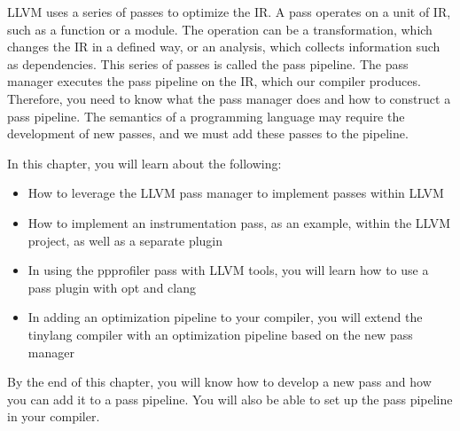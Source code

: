 
LLVM uses a series of passes to optimize the IR. A pass operates on a unit of IR, such as a function or a module. The operation can be a transformation, which changes the IR in a defined way, or an analysis, which collects information such as dependencies. This series of passes is called the pass pipeline. The pass manager executes the pass pipeline on the IR, which our compiler produces. Therefore, you need to know what the pass manager does and how to construct a pass pipeline. The semantics of a programming language may require the development of new passes, and we must add these passes to the pipeline.

In this chapter, you will learn about the following:

\begin{itemize}
\item
How to leverage the LLVM pass manager to implement passes within LLVM

\item
How to implement an instrumentation pass, as an example, within the LLVM project, as well as a separate plugin

\item
In using the ppprofiler pass with LLVM tools, you will learn how to use a pass plugin with opt and clang

\item
In adding an optimization pipeline to your compiler, you will extend the tinylang compiler with an optimization pipeline based on the new pass manager
\end{itemize}

By the end of this chapter, you will know how to develop a new pass and how you can add it to a pass pipeline. You will also be able to set up the pass pipeline in your compiler.